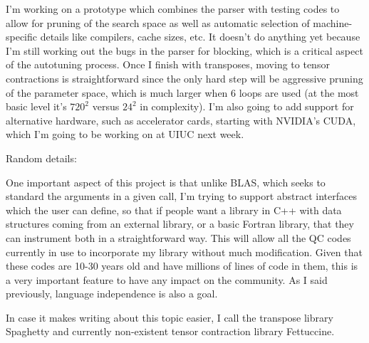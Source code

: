 \documentclass[letterpaper,12pt]{article}
\begin{document}
I'm working on a prototype which combines the parser with testing codes to allow for pruning of the search space as well as automatic selection of machine-specific details like compilers, cache sizes, etc.  It doesn't do anything yet because I'm still working out the bugs in the parser for blocking, which is a critical aspect of the autotuning process.  Once I finish with transposes, moving to tensor contractions is straightforward since the only hard step will be aggressive pruning of the parameter space, which is much larger when 6 loops are used (at the most basic level it's $720^2$ versus $24^2$ in complexity).  I'm also going to add support for alternative hardware, such as accelerator cards, starting with NVIDIA's CUDA, which I'm going to be working on at UIUC next week.

Random details:

One important aspect of this project is that unlike BLAS, which seeks to standard the arguments in a given call, I'm trying to support abstract interfaces which the user can define, so that if people want a library in C++ with data structures coming from an external library, or a basic Fortran library, that they can instrument both in a straightforward way.  This will allow all the QC codes currently in use to incorporate my library without much modification.  Given that these codes are 10-30 years old and have millions of lines of code in them, this is a very important feature to have any impact on the community.  As I said previously, language independence is also a goal.

In case it makes writing about this topic easier, I call the transpose library Spaghetty and currently non-existent tensor contraction library Fettuccine.
\end{document}
